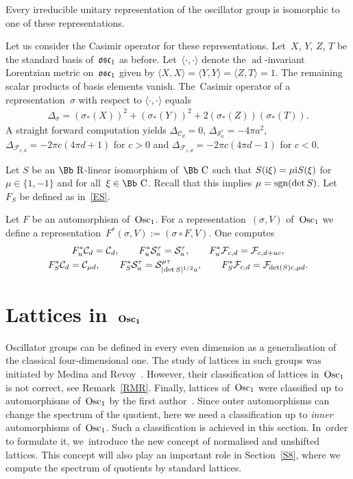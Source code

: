 \documentclass[pdftex]{sigma}
\newcommand\CC{{\mbox{\Bb C}}}
\newcommand\RR{{\mbox{\Bb R}}}
\newcommand\cC{{\mathcal C}}
\newcommand\cF{{\mathcal F}}
\newcommand\osc{\frak o \frak s \frak c}
\newcommand{\Osc}{{\rm Osc}}
\newcommand{\sgn}{\mathop{{\rm sgn}}}
\numberwithin{equation}{section}
\begin{document}
Every irreducible unitary representation of the oscillator group is isomorphic to one of these representations.

Let us consider the Casimir operator for these representations. Let~$X$, $Y$, $Z$, $T$ be the standard basis of~$\osc_1$ as before. Let~$\langle\cdot,\cdot\rangle$ denote the $\operatorname{ad}$-invariant Lorentzian metric on~$\osc_1$ given by
$\langle X,X\rangle=\langle Y,Y\rangle=\langle Z,T\rangle=1$.
The remaining scalar products of basis elements vanish.
The~Casi\-mir operator of a representation~$\sigma$ with respect to $\langle\cdot,\cdot\rangle$ equals
\begin{gather*}
\Delta_\sigma=(\sigma_*(X))^2+(\sigma_*(Y))^2+2(\sigma_*(Z))(\sigma_*(T)).
\end{gather*}
A straight forward computation yields $\Delta_{\cC_d}=0$, $\Delta_{{\mathcal S}_a^\tau}=-4\pi a^2$,
$\Delta_{\cF_{c,d}}=-2\pi c(4\pi d+1)$ for $c>0$
 and $\Delta_{\cF_{c,d}}=-2\pi c(4\pi d-1)$ for $c<0$.

Let $S$ be an $\RR$-linear isomorphism of~$\CC$ such that $S({\rm i}\xi)=\mu {\rm i}S(\xi)$ for $\mu\in\{1,-1\}$ and for all~$\xi\in\CC$. Recall that this implies
$\mu=\sgn(\det S)$. Let~$F_S$ be defined as in~\eqref{ES}.

Let $F$ be an automorphism of~$\Osc_1$. For a representation~$(\sigma,V)$ of~$\Osc_1$ we define a representation~$F^*(\sigma,V):=(\sigma\circ F,V)$. One computes
\begin{gather}
F_u^*\cC_d =\cC_d,\qquad
F_u^*{\mathcal S}^\tau_a ={\mathcal S}^\tau_a,\qquad
F_u^*{\mathcal F}_{c,d} ={\mathcal F}_{c,d+uc}, \nonumber
\\
F_S^*\cC_d =\cC_{\mu d},\qquad
F_S^*{\mathcal S}^\tau_a ={\mathcal S}^{\mu\tau}_{|\hspace{-1pt}\det S|^{1/2}a},\qquad
F_S^*{\mathcal F}_{c,d} ={\mathcal F}_{\hspace{-1pt}\det(S) c,\mu d}.
\label{Fiso}
\end{gather}

\section[Lattices in~$\Osc_1$]{Lattices in~$\boldsymbol{\Osc_1}$}\label{S4}
Oscillator groups can be defined in every even dimension as a generalisation of the classical four-dimensional one. The study of lattices in such groups was initiated by Medina and Revoy~\cite{MR}. However, their classification of lattices in~$\Osc_1$ is not correct, see Remark~\ref{RMR}. Finally, lattices of~$\Osc_1$ were classified up to automorphisms of~$\Osc_1$ by the first author~\cite{F}. Since outer automorphisms can change the spectrum of the quotient, here we need a classification up to {\it inner} automorphisms of~$\Osc_1$. Such a classification is achieved in this section. In~order to formulate it, we~introduce the new concept of normalised and unshifted lattices. This concept will also play an important role in Section~\ref{S8}, where we compute the spectrum of quotients by standard lattices.
\end{document}
